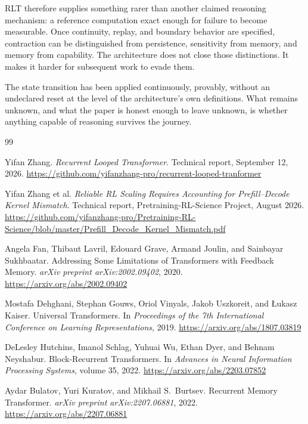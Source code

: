 \documentclass[11pt]{article}
\begin{document}
RLT therefore supplies something rarer than another claimed reasoning mechanism: a reference computation exact enough for failure to become measurable. Once continuity, replay, and boundary behavior are specified, contraction can be distinguished from persistence, sensitivity from memory, and memory from capability. The architecture does not close those distinctions. It makes it harder for subsequent work to evade them.

The state transition has been applied continuously, provably, without an undeclared reset at the level of the architecture's own definitions. What remains unknown, and what the paper is honest enough to leave unknown, is whether anything capable of reasoning survives the journey.

\begin{thebibliography}{99}

Yifan Zhang.
\newblock \textit{Recurrent Looped Transformer}.
\newblock Technical report, September 12, 2026.
\newblock \url{https://github.com/yifanzhang-pro/recurrent-looped-tranformer}

Yifan Zhang et al.
\newblock \textit{Reliable RL Scaling Requires Accounting for
Prefill--Decode Kernel Mismatch}.
\newblock Technical report, Pretraining-RL-Science Project, August 2026.
\newblock \url{https://github.com/yifanzhang-pro/Pretraining-RL-Science/blob/master/Prefill_Decode_Kernel_Mismatch.pdf}

Angela Fan, Thibaut Lavril, Edouard Grave, Armand Joulin, and
Sainbayar Sukhbaatar.
\newblock Addressing Some Limitations of Transformers with Feedback Memory.
\newblock \textit{arXiv preprint arXiv:2002.09402}, 2020.
\newblock \url{https://arxiv.org/abs/2002.09402}

Mostafa Dehghani, Stephan Gouws, Oriol Vinyals, Jakob Uszkoreit, and
{\L}ukasz Kaiser.
\newblock Universal Transformers.
\newblock In \textit{Proceedings of the 7th International Conference on
Learning Representations}, 2019.
\newblock \url{https://arxiv.org/abs/1807.03819}

DeLesley Hutchins, Imanol Schlag, Yuhuai Wu, Ethan Dyer, and
Behnam Neyshabur.
\newblock Block-Recurrent Transformers.
\newblock In \textit{Advances in Neural Information Processing Systems},
volume 35, 2022.
\newblock \url{https://arxiv.org/abs/2203.07852}

Aydar Bulatov, Yuri Kuratov, and Mikhail S.\ Burtsev.
\newblock Recurrent Memory Transformer.
\newblock \textit{arXiv preprint arXiv:2207.06881}, 2022.
\newblock \url{https://arxiv.org/abs/2207.06881}


\end{thebibliography}
\end{document}
